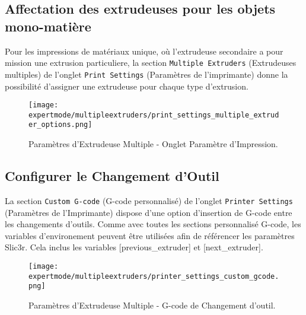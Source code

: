 
\subsection{Affectation des extrudeuses pour les objets mono-mati\`ere} %
\label{sub:assigning_extruders}

Pour les impressions de mat\'eriaux unique, o\`u l'extrudeuse secondaire a pour mission une extrusion particuliere, la section \texttt{Multiple Extruders} (Extrudeuses multiples) de l'onglet \texttt{Print Settings} (Param\`etres de l'imprimante) donne la possibilit\'e d'assigner une extrudeuse pour chaque type d'extrusion.

\begin{figure}[H]
\centering
\texttt{[image: expertmode/multipleextruders/print\_settings\_multiple\_extruder\_options.png]}
\caption{Param\`etres d'Extrudeuse Multiple - Onglet Param\`etre d'Impression.}
\label{fig:advanced_multiple_extruder_options}
\end{figure}


\subsection{Configurer le Changement d'Outil} %
\label{sub:configuring_tool_changes}


La section \texttt{Custom G-code} (G-code personnalis\'e) de l'onglet \texttt{Printer Settings} (Param\`etres de l'Imprimante) dispose d'une option d'insertion de G-code entre les changements d'outils. Comme avec toutes les sections personnalis\'e G-code, les variables d'environement peuvent \^etre utilis\'ees afin de r\'ef\'erencer les param\`etres Slic3r.  Cela inclus les variables [previous\_extruder] et [next\_extruder].

\begin{figure}[H]
\centering
\texttt{[image: expertmode/multipleextruders/printer\_settings\_custom\_gcode.png]}
\caption{Param\`etres d'Extrudeuse Multiple - G-code de Changement d'outil.}
\label{fig:printer_settings_custom_gcode}
\end{figure}

